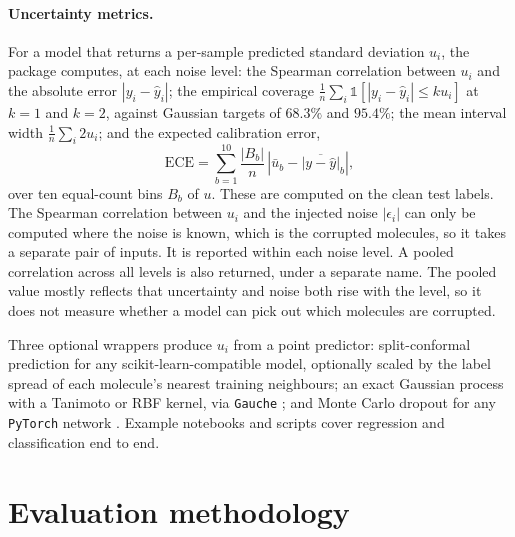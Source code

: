 \paragraph{Uncertainty metrics.} For a model that returns a per-sample predicted standard deviation
$u_i$, the package computes, at each noise level: the Spearman correlation between $u_i$ and the
absolute error $|y_i - \hat{y}_i|$; the empirical coverage $\frac{1}{n}\sum_i \mathbb{1}\left[|y_i -
\hat{y}_i| \le k u_i\right]$ at $k = 1$ and $k = 2$, against Gaussian targets of $68.3\%$ and
$95.4\%$; the mean interval width $\frac{1}{n}\sum_i 2u_i$; and the expected calibration error,
\begin{equation}
\mathrm{ECE} = \sum_{b=1}^{10} \frac{|B_b|}{n}\,\left|\bar{u}_b - \overline{|y - \hat{y}|}_b\right|,
\label{eq:ece}
\end{equation}
over ten equal-count bins $B_b$ of $u$. These are computed on the clean test labels. The Spearman
correlation between $u_i$ and the injected noise $|\epsilon_i|$ can only be computed where the noise
is known, which is the corrupted molecules, so it takes a separate pair of inputs. It is reported
within each noise level. A pooled correlation across all levels is also returned, under a separate
name. The pooled value mostly reflects that uncertainty and noise both rise with the level, so it
does not measure whether a model can pick out which molecules are corrupted.

Three optional wrappers produce $u_i$ from a point predictor: split-conformal prediction for any
scikit-learn-compatible model, optionally scaled by the label spread of each molecule's nearest
training neighbours; an exact Gaussian process with a Tanimoto or RBF kernel, via \texttt{Gauche}
\citep{gauche}; and Monte Carlo dropout for any \texttt{PyTorch} network \citep{gal2016}. Example
notebooks and scripts cover regression and classification end to end.


\section{Evaluation methodology}

